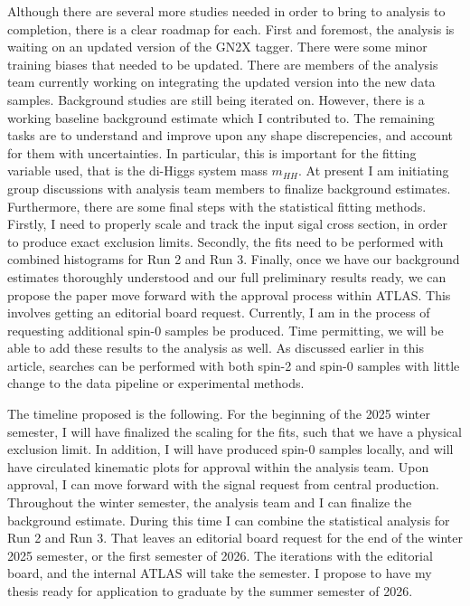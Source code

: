 \documentclass[12pt]{article}
\begin{document}
Although there are several more studies needed in order to bring to analysis to
completion, there is a clear roadmap for each. First and foremost, the analysis
is waiting on an updated version of the GN2X tagger. There were some minor
training biases that needed to be updated. There are members of the analysis
team currently working on integrating the updated version into the new data
samples. Background studies are still being iterated on. However, there is a
working baseline background estimate which I contributed to. The remaining tasks
are to understand and improve upon any shape discrepencies, and account for them
with uncertainties. In particular, this is important for the fitting variable
used, that is the di-Higgs system mass $m_{HH}$. At present I am initiating
group discussions with analysis team members to finalize background estimates.
Furthermore, there are some final steps with the statistical fitting methods.
Firstly, I need to properly scale and track the input sigal cross section, in
order to produce exact exclusion limits. Secondly, the fits need to be performed
with combined histograms for Run 2 and Run 3. Finally, once we have our
background estimates thoroughly understood and our full preliminary results
ready, we can propose the paper move forward with the approval process within
ATLAS. This involves getting an editorial board request. Currently, I am in the
process of requesting additional spin-0 samples be produced. Time permitting, we
will be able to add these results to the analysis as well. As discussed earlier
in this article, searches can be performed with both spin-2 and spin-0 samples
with little change to the data pipeline or experimental methods.

The timeline proposed is the following. For the beginning of the 2025 winter
semester, I will have finalized the scaling for the fits, such that we have a
physical exclusion limit. In addition, I will have produced spin-0 samples
locally, and will have circulated kinematic plots for approval within the
analysis team. Upon approval, I can move forward with the signal request from
central production. Throughout the winter semester, the analysis team and I can
finalize the background estimate. During this time I can combine the statistical
analysis for Run 2 and Run 3. That leaves an editorial board request for the end
of the winter 2025 semester, or the first semester of 2026. The iterations with
the editorial board, and the internal ATLAS will take the semester. I propose to
have my thesis ready for application to graduate by the summer semester of 2026.
\end{document}
